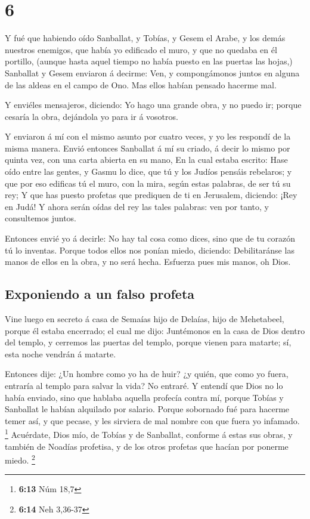 \hypertarget{section-5}{%
\section{6}\label{section-5}}

 Y fué que habiendo oído Sanballat, y Tobías, y Gesem el
Arabe, y los demás nuestros enemigos, que había yo edificado el muro, y
que no quedaba en él portillo, (aunque hasta aquel tiempo no había
puesto en las puertas las hojas,)  Sanballat y Gesem
enviaron á decirme: Ven, y compongámonos juntos en alguna de las aldeas
en el campo de Ono. Mas ellos habían pensado hacerme mal.

 Y enviéles mensajeros, diciendo: Yo hago una grande obra, y
no puedo ir; porque cesaría la obra, dejándola yo para ir á vosotros.

 Y enviaron á mí con el mismo asunto por cuatro veces, y yo
les respondí de la misma manera.  Envió entonces Sanballat á
mí su criado, á decir lo mismo por quinta vez, con una carta abierta en
su mano,  En la cual estaba escrito: Hase oído entre las
gentes, y Gasmu lo dice, que tú y los Judíos pensáis rebelaros; y que
por eso edificas tú el muro, con la mira, según estas palabras, de ser
tú su rey;  Y que has puesto profetas que prediquen de ti en
Jerusalem, diciendo: ¡Rey en Judá! Y ahora serán oídas del rey las tales
palabras: ven por tanto, y consultemos juntos.

 Entonces envié yo á decirle: No hay tal cosa como dices,
sino que de tu corazón tú lo inventas.  Porque todos ellos
nos ponían miedo, diciendo: Debilitaránse las manos de ellos en la obra,
y no será hecha. Esfuerza pues mis manos, oh Dios.

\hypertarget{exponiendo-a-un-falso-profeta}{%
\subsection{Exponiendo a un falso
profeta}\label{exponiendo-a-un-falso-profeta}}

 Vine luego en secreto á casa de Semaías hijo de Delaías,
hijo de Mehetabeel, porque él estaba encerrado; el cual me dijo:
Juntémonos en la casa de Dios dentro del templo, y cerremos las puertas
del templo, porque vienen para matarte; sí, esta noche vendrán á
matarte.

 Entonces dije: ¿Un hombre como yo ha de huir? ¿y quién,
que como yo fuera, entraría al templo para salvar la vida? No entraré.
 Y entendí que Dios no lo había enviado, sino que hablaba
aquella profecía contra mí, porque Tobías y Sanballat le habían
alquilado por salario.  Porque sobornado fué para hacerme
temer así, y que pecase, y les sirviera de mal nombre con que fuera yo
infamado. \footnote{\textbf{6:13} Núm 18,7}  Acuérdate,
Dios mío, de Tobías y de Sanballat, conforme á estas sus obras, y
también de Noadías profetisa, y de los otros profetas que hacían por
ponerme miedo. \footnote{\textbf{6:14} Neh 3,36-37}

